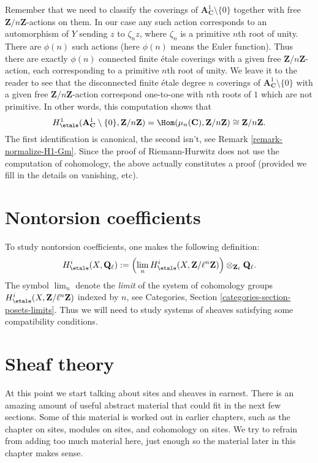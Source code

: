 \medskip\noindent
Remember that we need to classify the coverings of
${\mathbf{A}^1_\mathbf{C} \setminus \{0\}}$ together with free
$\mathbf{Z}/n\mathbf{Z}$-actions on them.
In our case any such action corresponds
to an automorphism of $Y$ sending $z$ to $\zeta_n z$, where $\zeta_n$ is a
primitive $n$th root of unity. There are $\phi(n)$ such actions
(here $\phi(n)$ means the Euler function). Thus there are exactly
$\phi(n)$ connected finite \'etale coverings with a given free
$\mathbf{Z}/n\mathbf{Z}$-action, each corresponding to a primitive
$n$th root of unity. We leave it to the reader to see that the
disconnected finite \'etale degree $n$ coverings of
$\mathbf{A}^1_{\mathbf{C}} \setminus \{0\}$ with a given free
$\mathbf{Z}/n\mathbf{Z}$-action correspond one-to-one with $n$th
roots of $1$ which are not primitive.
In other words, this computation shows that
$$
H_\etale^1 (\mathbf{A}^1_\mathbf{C} \setminus \{0\},
\mathbf{Z}/n\mathbf{Z}) =
\Hom(\mu_n(\mathbf{C}), \mathbf{Z}/n\mathbf{Z}) \cong \mathbf{Z}/n\mathbf{Z}.
$$
The first identification is canonical, the second isn't, see
Remark \ref{remark-normalize-H1-Gm}.
Since the proof of Riemann-Hurwitz does not use the computation of
cohomology, the above actually constitutes a proof (provided we
fill in the details on vanishing, etc).




\section{Nontorsion coefficients}
\label{section-nontorsion}

\noindent
To study nontorsion coefficients, one makes the following definition:
$$
H_\etale^i (X, \mathbf{Q}_\ell) :=
\left( \lim_n H_\etale^i(X, \mathbf{Z}/\ell^n\mathbf{Z}) \right)
\otimes_{\mathbf{Z}_\ell} \mathbf{Q}_\ell.
$$
The symbol $\lim_n$ denote the {\it limit} of the system of
cohomology groups $H_\etale^i(X, \mathbf{Z}/\ell^n\mathbf{Z})$ indexed
by $n$, see
Categories, Section \ref{categories-section-posets-limits}.
Thus we will need to study systems of sheaves satisfying some compatibility
conditions.




\section{Sheaf theory}
\label{section-sheaf-theory}

\noindent
At this point we start talking about sites and sheaves in earnest.
There is an amazing amount of useful abstract material that could fit
in the next few sections. Some of this material is worked out in earlier
chapters, such as the chapter on sites, modules on sites, and cohomology
on sites. We try to refrain from adding too much material here, just
enough so the material later in this chapter makes sense.





